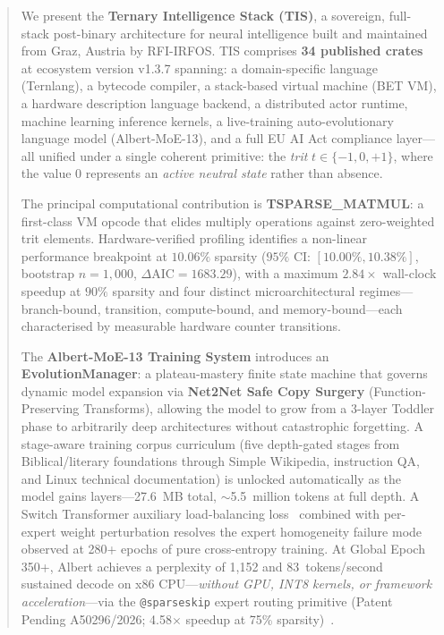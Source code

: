 \documentclass[journal,10pt,twocolumn]{IEEEtran}
\begin{document}
\begin{abstract}
We present the \textbf{Ternary Intelligence Stack (TIS)}, a sovereign,
full-stack post-binary architecture for neural intelligence built and
maintained from Graz, Austria by RFI-IRFOS. TIS comprises
\textbf{34 published crates} at ecosystem version v1.3.7 spanning: a
domain-specific language (Ternlang), a bytecode compiler, a stack-based
virtual machine (BET VM), a hardware description language backend, a
distributed actor runtime, machine learning inference kernels, a
live-training auto-evolutionary language model (Albert-MoE-13), and a
full EU AI Act compliance layer—all unified under a single coherent
primitive: the \emph{trit} $t \in \{-1, 0, +1\}$, where the value
$0$ represents an \emph{active neutral state} rather than absence.

The principal computational contribution is \textbf{TSPARSE\_MATMUL}: a
first-class VM opcode that elides multiply operations against zero-weighted
trit elements. Hardware-verified profiling identifies a non-linear performance
breakpoint at $10.06\%$ sparsity ($95\%$ CI: $[10.00\%, 10.38\%]$,
bootstrap $n = 1{,}000$, $\Delta\text{AIC} = 1683.29$), with a maximum
$2.84\times$ wall-clock speedup at $90\%$ sparsity and four distinct
microarchitectural regimes---branch-bound, transition, compute-bound, and
memory-bound---each characterised by measurable hardware counter transitions.

The \textbf{Albert-MoE-13 Training System} introduces an
\textbf{EvolutionManager}: a plateau-mastery finite state machine that
governs dynamic model expansion via \textbf{Net2Net Safe Copy Surgery}
(Function-Preserving Transforms), allowing the model to grow from a
3-layer Toddler phase to arbitrarily deep architectures without
catastrophic forgetting. A stage-aware training corpus curriculum (five
depth-gated stages from Biblical/literary foundations through Simple
Wikipedia, instruction QA, and Linux technical documentation) is
unlocked automatically as the model gains layers---27.6~MB total,
$\sim$5.5~million tokens at full depth. A Switch Transformer auxiliary
load-balancing loss~\cite{fedus2022switch} combined with per-expert
weight perturbation resolves the expert homogeneity failure mode observed
at 280+ epochs of pure cross-entropy training. At Global Epoch 350+,
Albert achieves a perplexity of 1{,}152 and 83~tokens/second sustained
decode on x86 CPU---\emph{without GPU, INT8 kernels, or framework
acceleration}---via the \texttt{@sparseskip} expert routing primitive
(Patent Pending A50296/2026; 4.58$\times$ speedup at 75\% sparsity)~\cite{tis2026moetest}.


\end{abstract}
\end{document}
